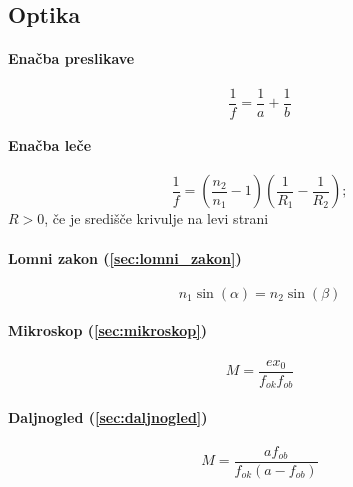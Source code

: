 \documentclass[a4paper,12pt]{article}
\begin{document}
\subsection{Optika}
\begin{multicols}{2}
    \paragraph{Enačba preslikave}
    \begin{equation}
        \frac{1}{f} = \frac{1}{a} + \frac{1}{b}
    \end{equation}

    \paragraph{Enačba leče}
    \begin{equation}
        \frac{1}{f} = (\frac{n_2}{n_1} - 1) ( \frac{1}{R_1} - \frac{1}{R_2} );
    \end{equation}
    $R > 0$, če je središče krivulje na levi strani

    \paragraph{Lomni zakon (\ref{sec:lomni_zakon})} 
    \begin{equation}
        n_1 \sin(\alpha) = n_2 \sin(\beta)
    \end{equation}

    \paragraph{Mikroskop (\ref{sec:mikroskop})}
    \begin{equation}
        M = \frac{e x_0}{f_{ok} f_{ob}}
    \end{equation}

    \paragraph{Daljnogled (\ref{sec:daljnogled})}
    \begin{equation}
        M = \frac{a f_{ob}}{f_{ok} (a - f_{ob})}
    \end{equation}
\end{multicols}
\end{document}
